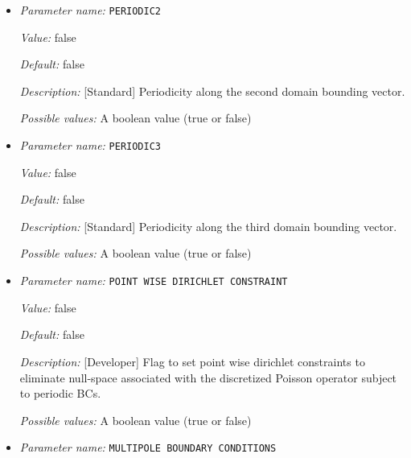 \begin{itemize}
{\it Value:} false


{\it Default:} false


{\it Description:} [Standard] Periodicity along the first domain bounding vector.


{\it Possible values:} A boolean value (true or false)
\item {\it Parameter name:} {\tt PERIODIC2}
\label{parameters:Boundary conditions/PERIODIC2}
\label{parameters:Boundary_20conditions/PERIODIC2}


{\it Value:} false


{\it Default:} false


{\it Description:} [Standard] Periodicity along the second domain bounding vector.


{\it Possible values:} A boolean value (true or false)
\item {\it Parameter name:} {\tt PERIODIC3}
\label{parameters:Boundary conditions/PERIODIC3}
\label{parameters:Boundary_20conditions/PERIODIC3}


{\it Value:} false


{\it Default:} false


{\it Description:} [Standard] Periodicity along the third domain bounding vector.


{\it Possible values:} A boolean value (true or false)
\item {\it Parameter name:} {\tt POINT WISE DIRICHLET CONSTRAINT}
\label{parameters:Boundary conditions/POINT WISE DIRICHLET CONSTRAINT}
\label{parameters:Boundary_20conditions/POINT_20WISE_20DIRICHLET_20CONSTRAINT}


{\it Value:} false


{\it Default:} false


{\it Description:} [Developer] Flag to set point wise dirichlet constraints to eliminate null-space associated with the discretized Poisson operator subject to periodic BCs.


{\it Possible values:} A boolean value (true or false)
\item {\it Parameter name:} {\tt MULTIPOLE BOUNDARY CONDITIONS}
\label{parameters:Boundary conditions/MULTIPOLE BOUNDARY CONDITIONS}
\label{parameters:Boundary_20conditions/MULTIPOLE_20BOUNDARY_20CONDITIONS}



\end{itemize}
